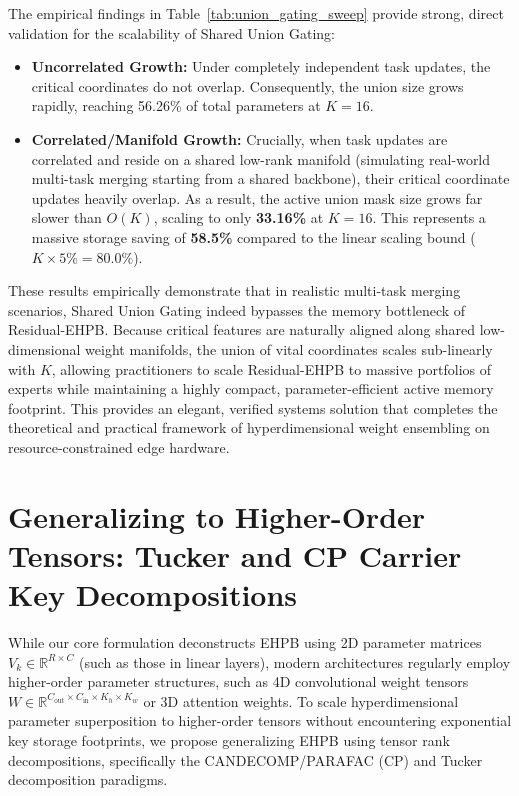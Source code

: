 \documentclass{article}
\theoremstyle{plain}
\theoremstyle{definition}
\theoremstyle{remark}
\begin{document}
The empirical findings in Table~\ref{tab:union_gating_sweep} provide strong, direct validation for the scalability of Shared Union Gating:
\begin{itemize}
\item \textbf{Uncorrelated Growth:} Under completely independent task updates, the critical coordinates do not overlap. Consequently, the union size grows rapidly, reaching 56.26\% of total parameters at $K=16$.
\item \textbf{Correlated/Manifold Growth:} Crucially, when task updates are correlated and reside on a shared low-rank manifold (simulating real-world multi-task merging starting from a shared backbone), their critical coordinate updates heavily overlap. As a result, the active union mask size grows far slower than $O(K)$, scaling to only \textbf{33.16\%} at $K=16$. This represents a massive storage saving of \textbf{58.5\%} compared to the linear scaling bound ($K \times 5\% = 80.0\%$).
\end{itemize}

These results empirically demonstrate that in realistic multi-task merging scenarios, Shared Union Gating indeed bypasses the memory bottleneck of Residual-EHPB. Because critical features are naturally aligned along shared low-dimensional weight manifolds, the union of vital coordinates scales sub-linearly with $K$, allowing practitioners to scale Residual-EHPB to massive portfolios of experts while maintaining a highly compact, parameter-efficient active memory footprint. This provides an elegant, verified systems solution that completes the theoretical and practical framework of hyperdimensional weight ensembling on resource-constrained edge hardware.

\section{Generalizing to Higher-Order Tensors: Tucker and CP Carrier Key Decompositions}
\label{app:tensor_decompositions}

While our core formulation deconstructs EHPB using 2D parameter matrices $V_k \in \mathbb{R}^{R \times C}$ (such as those in linear layers), modern architectures regularly employ higher-order parameter structures, such as 4D convolutional weight tensors $W \in \mathbb{R}^{C_{\text{out}} \times C_{\text{in}} \times K_h \times K_w}$ or 3D attention weights. To scale hyperdimensional parameter superposition to higher-order tensors without encountering exponential key storage footprints, we propose generalizing EHPB using tensor rank decompositions, specifically the CANDECOMP/PARAFAC (CP) and Tucker decomposition paradigms.
\end{document}

